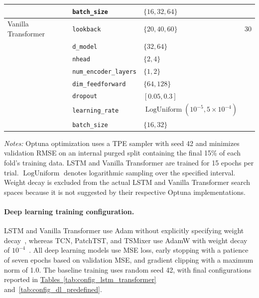 \documentclass[runningheads,orivec]{llncs}
\begin{document}
\begin{table}[htbp]
\begin{tabular}{lllr}
     & \texttt{batch\_size}    & $\{16, 32, 64\}$                            & \\
\hline
Vanilla Transformer & \texttt{lookback}           & $\{20, 40, 60\}$                                   & 30 \\
                    & \texttt{d\_model}           & $\{32, 64\}$                                       & \\
                    & \texttt{nhead}              & $\{2, 4\}$                                         & \\
                    & \texttt{num\_encoder\_layers}& $\{1, 2\}$                                        & \\
                    & \texttt{dim\_feedforward}   & $\{64, 128\}$                                      & \\
                    & \texttt{dropout}            & $[0.05, 0.3]$                                      & \\
                    & \texttt{learning\_rate}      & $\operatorname{LogUniform}(10^{-5}, 5\times 10^{-4})$ & \\
                    & \texttt{batch\_size}         & $\{16, 32\}$                                       & \\
\hline
\end{tabular}
\par\vspace{4pt}\parbox{\linewidth}{\scriptsize\textit{Notes:} Optuna optimization uses a TPE sampler with seed 42 and minimizes validation RMSE on an internal purged split containing the final 15\% of each fold's training data. LSTM and Vanilla Transformer are trained for 15 epochs per trial. $\operatorname{LogUniform}$ denotes logarithmic sampling over the specified interval. Weight decay is excluded from the actual LSTM and Vanilla Transformer search spaces because it is not suggested by their respective Optuna implementations.}
\end{table}

\paragraph{Deep learning training configuration.} LSTM and Vanilla Transformer use Adam without explicitly specifying weight decay~\cite{kingma2014}, whereas TCN, PatchTST, and TSMixer use AdamW with weight decay of $10^{-4}$~\cite{loshchilov2018decoupled}. All deep learning models use MSE loss, early stopping with a patience of seven epochs based on validation MSE, and gradient clipping with a maximum norm of 1.0. The baseline training uses random seed 42, with final configurations reported in \hyperref[tab:config_lstm_transformer]{Tables~\ref*{tab:config_lstm_transformer}} and~\hyperref[tab:config_dl_predefined]{\ref*{tab:config_dl_predefined}}.
\end{document}
